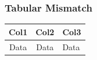 \begin{frame}
\frametitle{Tabular Mismatch}
\begin{table}
\begin{tabular}{|c|c|}
\hline
Col1 & Col2 & Col3 \\
\hline
Data & Data & Data \\
\hline
\end{tabular}
\end{table}
\end{frame}
